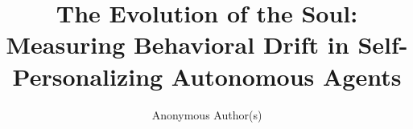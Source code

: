 \documentclass[sigconf,anonymous]{aamas}
\title[The Evolution of the Soul]{The Evolution of the Soul: Measuring Behavioral Drift in Self-Personalizing Autonomous Agents}
\author{Anonymous Author(s)}
\affiliation{
  \institution{Anonymous Institution}
  \city{City}
  \country{Country}}
\newif\ifwithappendix
\begin{document}


\maketitle













\FloatBarrier



\ifwithappendix
  \clearpage
  \setcounter{figure}{0}\setcounter{table}{0}
  \renewcommand{\thefigure}{S\arabic{figure}}\renewcommand{\theHfigure}{S\arabic{figure}}
  \renewcommand{\thetable}{S\arabic{table}}\renewcommand{\theHtable}{S\arabic{table}}
  
  \FloatBarrier
\fi
\end{document}
